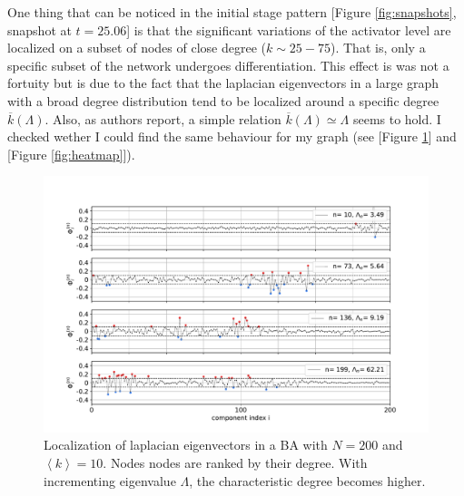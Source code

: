 One thing that can be noticed in the initial stage pattern [Figure \ref{fig:snapshots}, snapshot at $t = 25.06$] is that the significant variations of the activator level are localized on a subset of nodes of close degree ($k \sim 25-75$). That is, only a specific subset of the network undergoes differentiation. This effect is was not a fortuity but is due to the fact that the laplacian eigenvectors in a large graph with a broad degree distribution tend to be localized around a specific degree $\overline{k}(\Lambda)$. Also, as authors report, a simple relation $\overline{k}(\Lambda) \simeq \Lambda$ seems to hold. I checked wether I could find the same behaviour for my graph (see [Figure \ref{fig:eigenvectors}] and [Figure \ref{fig:heatmap}]).
\begin{figure}[H]
\centering
\includegraphics[width =\textwidth]{latex_source/images/turing/eigenvectors_200.pdf}
\caption{Localization of laplacian eigenvectors in 
a BA with $N=200$ and $\left \langle k \right \rangle = 10$. Nodes nodes are ranked by their degree. With incrementing eigenvalue $\Lambda$, the characteristic degree becomes higher.}
\label{fig:eigenvectors}
\end{figure}

